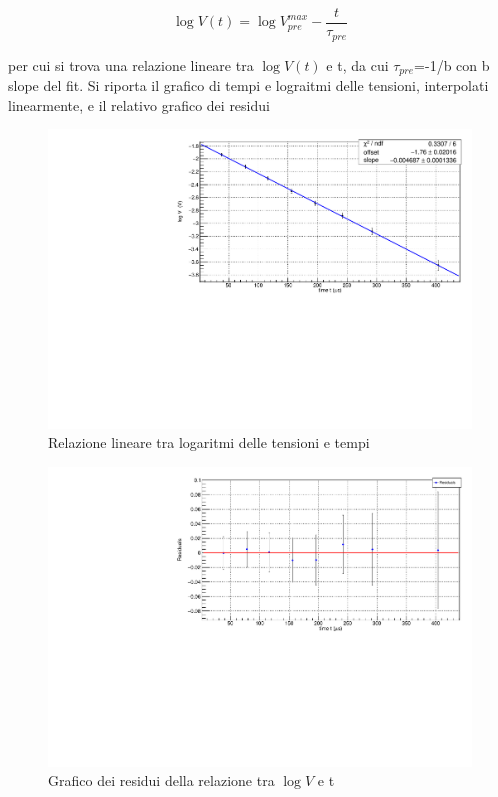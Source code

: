 \documentclass{article}
\begin{document}
\begin{equation}
    \log V(t) = \log V_{pre}^{max} - \frac{t}{\tau_{pre}}
\end{equation}

per cui si trova una relazione lineare tra $\log V(t)$ e t, da cui $\tau_{pre}$=-1/b con b slope del fit.
Si riporta il grafico di tempi e lograitmi delle tensioni, interpolati linearmente, e il relativo grafico dei residui

\begin{center}
\begin{figure}[H]
\centering
\includegraphics[scale=0.4, angle=0]{preampRC.pdf}
\caption{Relazione lineare tra logaritmi delle tensioni e tempi}
\label{fig:QinvsVpre}
\end{figure}
\end{center}

\begin{center}
\begin{figure}[H]
\centering
\includegraphics[scale=0.4, angle=0]{preampRCresidui.pdf}
\caption{Grafico dei residui della relazione tra $\log V$ e t}
\label{fig:QinvsVpre}
\end{figure}
\end{center}
\end{document}
